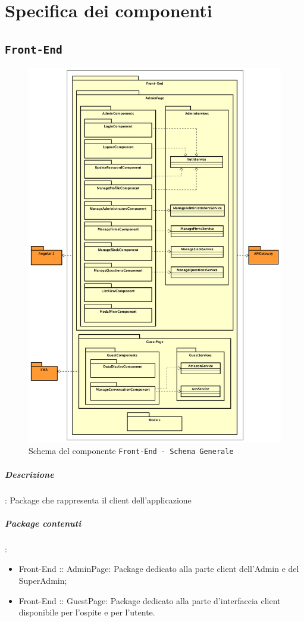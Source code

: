 \documentclass[../DefinizioneDiProdotto_v2.0.0.tex]{subfiles}
\begin{document}
\section{Specifica dei componenti}

\subsection{\texttt{Front-End}}
		\begin{figure}[!h]
			\centering
			\includegraphics[scale=0.3]{Architettura/Front-end.png}
			\caption{Schema del componente \texttt{Front-End - Schema Generale}}
		\end{figure}
		\subparagraph{Descrizione}: Package che rappresenta il client dell'applicazione
		\subparagraph{Package contenuti}:
		\begin{itemize}
			\item Front-End :: AdminPage: Package dedicato alla parte client dell'Admin e del SuperAdmin;
			\item Front-End :: GuestPage: Package dedicato alla parte d'interfaccia client disponibile per l'ospite e per l'utente.
		\end{itemize}
\end{document}
